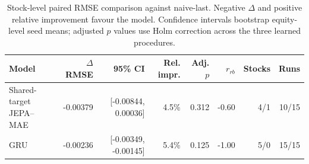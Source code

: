\begin{table}[t]
\centering
\small
\caption{Stock-level paired RMSE comparison against naive-last. Negative $\Delta$ and positive relative improvement favour the model. Confidence intervals bootstrap equity-level seed means; adjusted $p$ values use Holm correction across the three learned procedures.}
\label{tab:paired_rmse_naive}
\begin{tabular}{lrrrrrrr}
\toprule
Model & $\Delta$RMSE & 95\% CI & Rel. impr. & Adj. $p$ & $r_{rb}$ & Stocks & Runs \\
\midrule
Shared-target JEPA--MAE & -0.00379 & [-0.00844, 0.00036] & 4.5\% & 0.312 & -0.60 & 4/1 & 10/15 \\
GRU & -0.00236 & [-0.00349, -0.00145] & 5.4\% & 0.125 & -1.00 & 5/0 & 15/15 \\
\bottomrule
\end{tabular}
\end{table}
